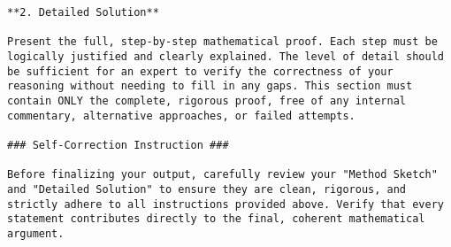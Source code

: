 \documentclass[12pt]{article}
\begin{document}
\begin{lstlisting}
**2. Detailed Solution**

Present the full, step-by-step mathematical proof. Each step must be logically justified and clearly explained. The level of detail should be sufficient for an expert to verify the correctness of your reasoning without needing to fill in any gaps. This section must contain ONLY the complete, rigorous proof, free of any internal commentary, alternative approaches, or failed attempts.

### Self-Correction Instruction ###

Before finalizing your output, carefully review your "Method Sketch" and "Detailed Solution" to ensure they are clean, rigorous, and strictly adhere to all instructions provided above. Verify that every statement contributes directly to the final, coherent mathematical argument.
\end{lstlisting}
\end{document}
